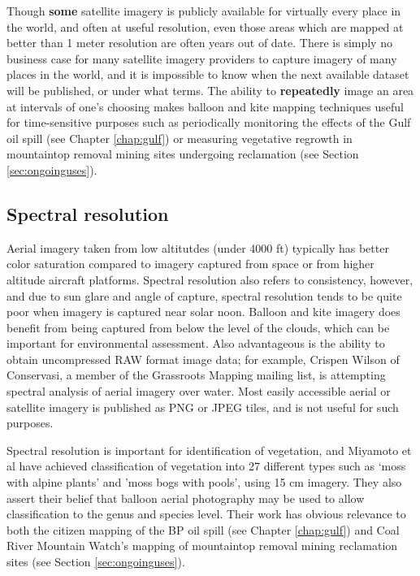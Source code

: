 \documentclass[11pt,oneside,notitlepage]{report}
\begin{document}
{{Though \textbf{some} satellite imagery is publicly available for virtually every place in the world, and often at useful resolution, even those areas which are mapped at better than 1 meter resolution are often years out of date. There is simply no business case for many satellite imagery providers to capture imagery of many places in the world, and it is impossible to know when the next available dataset will be published, or under what terms. \cite{oconnor2008maps} The ability to \textbf{repeatedly} image an area at intervals of one's choosing makes balloon and kite mapping techniques useful for time-sensitive purposes such as periodically monitoring the effects of the Gulf oil spill (see Chapter \ref{chap:gulf}) or measuring vegetative regrowth in mountaintop removal mining sites undergoing reclamation (see Section \ref{sec:ongoinguses}). 

\subsection{Spectral resolution}

Aerial imagery taken from low altitutdes (under 4000 ft) typically has better color saturation compared to imagery captured from space or from higher altitude aircraft platforms. Spectral resolution also refers to consistency, however, and due to sun glare and angle of capture, spectral resolution tends to be quite poor when imagery is captured near solar noon. Balloon and kite imagery does benefit from being captured from below the level of the clouds, which can be important for environmental assessment. Also advantageous is the ability to obtain uncompressed RAW format image data; for example, Crispen Wilson of Conservasi, a member of the Grassroots Mapping mailing list, is attempting spectral analysis of aerial imagery over water. Most easily accessible aerial or satellite imagery is published as PNG or JPEG tiles, and is not useful for such purposes.  

Spectral resolution is important for identification of vegetation, and Miyamoto et al have achieved classification of vegetation into 27 different types such as `moss with alpine plants' and 'moss bogs with pools', using 15 cm imagery. They also assert their belief that balloon aerial photography may be used to allow classification to the genus and species level. \cite{miyamoto2004use} Their work has obvious relevance to both the citizen mapping of the BP oil spill (see Chapter \ref{chap:gulf}) and Coal River Mountain Watch's mapping of mountaintop removal mining reclamation sites (see Section \ref{sec:ongoinguses}).

}}
\end{document}
